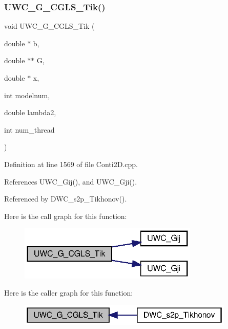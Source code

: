 \subsubsection{U\+W\+C\+\_\+\+G\+\_\+\+C\+G\+L\+S\+\_\+\+Tik()}
{\footnotesize\ttfamily void U\+W\+C\+\_\+\+G\+\_\+\+C\+G\+L\+S\+\_\+\+Tik (\begin{DoxyParamCaption}\item[{double $\ast$}]{b,  }\item[{double $\ast$$\ast$}]{G,  }\item[{double $\ast$}]{x,  }\item[{int}]{modelnum,  }\item[{double}]{lambda2,  }\item[{int}]{num\+\_\+thread }\end{DoxyParamCaption})}



Definition at line 1569 of file Conti2\+D.\+cpp.



References U\+W\+C\+\_\+\+Gij(), and U\+W\+C\+\_\+\+Gji().



Referenced by D\+W\+C\+\_\+s2p\+\_\+\+Tikhonov().

Here is the call graph for this function\+:\nopagebreak
\begin{figure}[H]
\begin{center}
\leavevmode
\includegraphics[width=242pt]{Conti2D_8cpp_a6e44071dbbec5b92ddf8673dea8c41de_a6e44071dbbec5b92ddf8673dea8c41de_cgraph}
\end{center}
\end{figure}
Here is the caller graph for this function\+:\nopagebreak
\begin{figure}[H]
\begin{center}
\leavevmode
\includegraphics[width=292pt]{Conti2D_8cpp_a6e44071dbbec5b92ddf8673dea8c41de_a6e44071dbbec5b92ddf8673dea8c41de_icgraph}
\end{center}
\end{figure}
\mbox{\label{Conti2D_8cpp_a632c1e4efbb7e9b1aaf04db729e69394_a632c1e4efbb7e9b1aaf04db729e69394}} 
